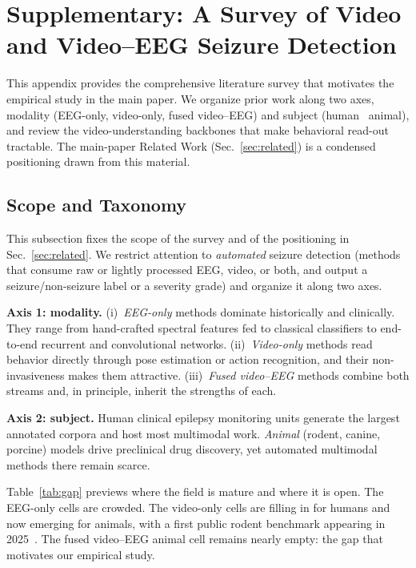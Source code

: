 \section{Supplementary: A Survey of Video and Video--EEG Seizure Detection}
\label{sec:survey}

This appendix provides the comprehensive literature survey that motivates the
empirical study in the main paper. We organize prior work along two axes, modality (EEG-only, video-only, fused video--EEG) and subject (human \vs\ animal), and review the video-understanding backbones that make behavioral
read-out tractable. The main-paper Related Work (Sec.~\ref{sec:related}) is a
condensed positioning drawn from this material.

\subsection{Scope and Taxonomy}
\label{sec:taxonomy}

This subsection fixes the scope of the survey and of the positioning in
Sec.~\ref{sec:related}. We restrict attention to \emph{automated} seizure
detection (methods that
consume raw or lightly processed EEG, video, or both, and output a
seizure/non-seizure label or a severity grade) and organize it along two axes.

\noindent\textbf{Axis 1: modality.}
(i)~\emph{EEG-only} methods dominate historically and clinically. They range from
hand-crafted spectral features fed to classical classifiers to end-to-end
recurrent and convolutional networks. (ii)~\emph{Video-only} methods read behavior
directly through pose estimation or action recognition, and their non-invasiveness
makes them attractive. (iii)~\emph{Fused video--EEG} methods combine both streams
and, in principle, inherit the strengths of each.

\noindent\textbf{Axis 2: subject.}
Human clinical epilepsy monitoring units generate the largest annotated corpora
and host most multimodal work. \emph{Animal} (rodent, canine, porcine) models
drive preclinical drug discovery, yet automated multimodal methods there remain
scarce.

Table~\ref{tab:gap} previews where the field is mature and where it is open. The
EEG-only cells are crowded. The video-only cells are filling in for humans and now
emerging for animals, with a first public rodent benchmark appearing in
2025~\cite{rodepil2025}. The fused video--EEG animal cell remains nearly
empty: the gap that motivates our empirical study.

